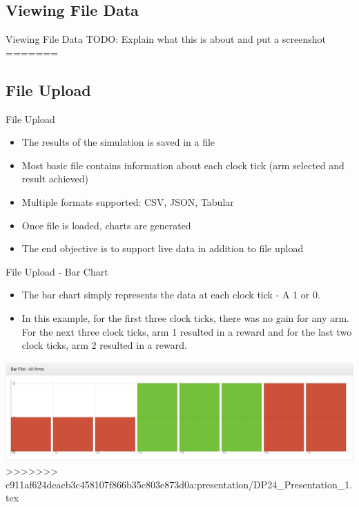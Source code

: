 \documentclass{beamer}
\begin{document}
\subsection{Viewing File Data}
\begin{frame}{Viewing File Data}
TODO: Explain what this is about and put a screenshot
=======
\subsection{File Upload}
\begin{frame}{File Upload}
 	\begin{itemize}
   		\item The results of the simulation is saved in a file
		\item Most basic file contains information about each clock tick (arm selected and result achieved)
		\item Multiple formats supported: CSV, JSON, Tabular
		\item Once file is loaded, charts are generated
		\item The end objective is to support live data in addition to file upload
	\end{itemize}
\end{frame}

\begin{frame}{File Upload - Bar Chart}
\begin{itemize}
\item The bar chart simply represents the data at each clock tick - A 1 or 0. 
\item In this example, for the first three clock ticks, there was no gain for any arm. For the next three clock ticks, arm 1 resulted in a reward and for the last two clock ticks, arm 2 resulted in a reward.
\end{itemize}
\includegraphics[scale=0.25]{barchart.png}
>>>>>>> c911af624deacb3c458107f866b35c803e873d0a:presentation/DP24_Presentation_1.tex
\end{frame}


\end{frame}
\end{document}

